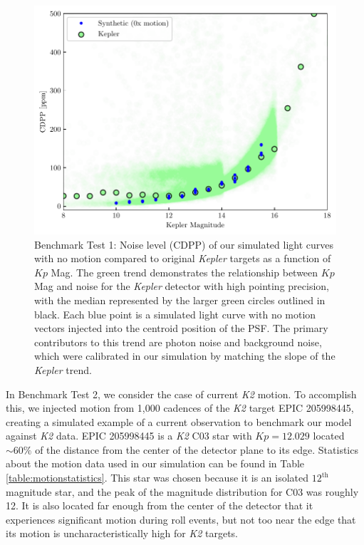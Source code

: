\documentclass[12pt,preprint]{aastex}
\begin{document}
\begin{figure}[h]
	\centering
	\includegraphics[width=1.0\linewidth]{kepler_benchmark.pdf}
	\caption{Benchmark Test 1: Noise level (CDPP) of our simulated light curves with no motion compared to original \textit{Kepler} targets as a function of $Kp$ Mag. The green trend demonstrates the relationship between $Kp$ Mag and noise for the \textit{Kepler} detector with high pointing precision, with the median represented by the larger green circles outlined in black. Each blue point is a simulated light curve with no motion vectors injected into the centroid position of the PSF. The primary contributors to this trend are photon noise and background noise, which were calibrated in our simulation by matching the slope of the \textit{Kepler} trend.}
	\label{fig:nomotion}
\end{figure}

In Benchmark Test 2, we consider the case of current \textit{K2} motion. To accomplish this, we injected motion from 1,000 cadences of the \textit{K2} target EPIC 205998445, creating a simulated example of a current observation to benchmark our model against \textit{K2} data. EPIC 205998445 is a \textit{K2} C03 star with $Kp = 12.029$ located ${\sim}60\%$ of the distance from the center of the detector plane to its edge. Statistics about the motion data used in our simulation can be found in Table \ref{table:motionstatistics}. This star was chosen because it is an isolated $12^{\text{th}}$ magnitude star, and the peak of the magnitude distribution for C03 was roughly 12. It is also located far enough from the center of the detector that it experiences significant motion during roll events, but not too near the edge that its motion is uncharacteristically high for \textit{K2} targets.
\end{document}
